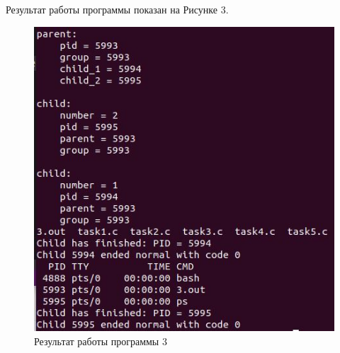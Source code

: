 \documentclass[14pt, a4paper]{extarticle}
\begin{document}
	Результат работы программы показан на Рисунке 3.
	\begin{figure}[h!]
		\centering
		\includegraphics[scale=1]{source/3}
		\caption{Результат работы программы 3}
	\end{figure}


	 \clearpage
\end{document}
